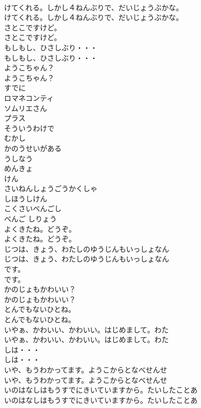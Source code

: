 \documentclass[8pt]{extreport}
\begin{document}
\begin{CJK}{UTF8}{min}
\\	けてくれる。しかし４ねんぶりで、だいじょうぶかな。
\\	けてくれる。しかし４ねんぶりで、だいじょうぶかな。
\\	さとこですけど。
\\	さとこですけど。
\\	もしもし、ひさしぶり・・・
\\	もしもし、ひさしぶり・・・
\\	ようこちゃん？
\\	ようこちゃん？
\\	すでに
\\	ロマネコンティ
\\	ソムリエさん
\\	プラス
\\	そういうわけで
\\	むかし
\\	かのうせいがある
\\	うしなう
\\	めんきょ
\\	けん
\\	さいねんしょうごうかくしゃ
\\	しほうしけん
\\	こくさいべんごし
\\	べんご しりょう
\\	よくきたね。どうぞ。
\\	よくきたね。どうぞ。
\\	じつは、きょう、わたしのゆうじんもいっしょなん
\\	じつは、きょう、わたしのゆうじんもいっしょなん
\\	です。
\\	です。
\\	かのじょもかわいい？
\\	かのじょもかわいい？
\\	とんでもないひとね。
\\	とんでもないひとね。
\\	いやぁ、かわいい、かわいい。はじめまして。わた
\\	いやぁ、かわいい、かわいい。はじめまして。わた
\\	しは・・・
\\	しは・・・
\\	いや、もうわかってます。ようこからとなべせんせ
\\	いや、もうわかってます。ようこからとなべせんせ
\\	いのはなしはもうすでにきいていますから。たいしたことあ
\\	いのはなしはもうすでにきいていますから。たいしたことあ

\end{CJK}
\end{document}
